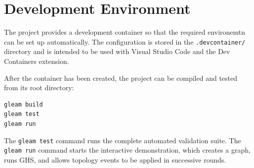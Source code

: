 \appendix

\chapter{Development Environment}\label{app:devenv}

The project provides a development container so that the required environemtn can be set
up automatically. The configuration is stored in the \texttt{.devcontainer/} directory and
is intended to be used with Visual Studio Code and the Dev Containers extension.

After the container has been created, the project can be compiled and tested from its root
directory:

\begin{verbatim}
gleam build
gleam test
gleam run
\end{verbatim}

The \texttt{gleam test} command runs the complete automated validation suite. The
\texttt{gleam run} command starts the interactive demonstration, which creates a graph,
runs GHS, and allows topology events to be applied in successive rounds.
